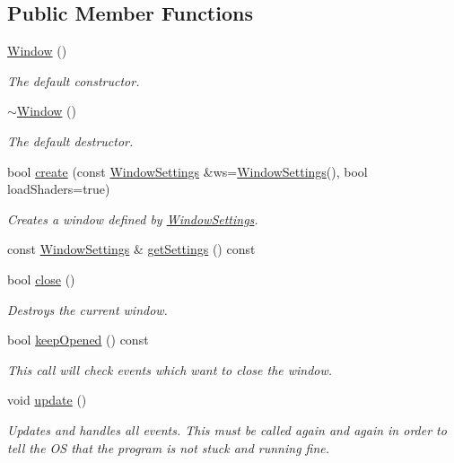 \subsection*{Public Member Functions}
\begin{DoxyCompactItemize}
\item 
\hyperlink{classburn_1_1_window_acc7f6464e1ed22854f41342becb51e62}{Window} ()
\begin{DoxyCompactList}\small\item\em The default constructor. \end{DoxyCompactList}\item 
\hyperlink{classburn_1_1_window_a47bd487f48808cab78faa5713e15f0c3}{$\sim$\-Window} ()
\begin{DoxyCompactList}\small\item\em The default destructor. \end{DoxyCompactList}\item 
bool \hyperlink{classburn_1_1_window_a6b8ac2866e1997d479becef84b3a4cf2}{create} (const \hyperlink{classburn_1_1_window_settings}{Window\-Settings} \&ws=\hyperlink{classburn_1_1_window_settings}{Window\-Settings}(), bool load\-Shaders=true)
\begin{DoxyCompactList}\small\item\em Creates a window defined by \hyperlink{classburn_1_1_window_settings}{Window\-Settings}. \end{DoxyCompactList}\item 
const \hyperlink{classburn_1_1_window_settings}{Window\-Settings} \& \hyperlink{classburn_1_1_window_a988e564ed812770ae184cf22bf05e730}{get\-Settings} () const 
\item 
bool \hyperlink{classburn_1_1_window_a1bed3eba8c1da3f0a58a3ed5de2c1071}{close} ()
\begin{DoxyCompactList}\small\item\em Destroys the current window. \end{DoxyCompactList}\item 
bool \hyperlink{classburn_1_1_window_aefd7af7009fee4982b04ac946540f7ee}{keep\-Opened} () const 
\begin{DoxyCompactList}\small\item\em This call will check events which want to close the window. \end{DoxyCompactList}\item 
void \hyperlink{classburn_1_1_window_a81e1da9f111938b38bc4c2c06dac9cfd}{update} ()
\begin{DoxyCompactList}\small\item\em Updates and handles all events. This must be called again and again in order to tell the O\-S that the program is not stuck and running fine. \end{DoxyCompactList}\item 

\end{DoxyCompactItemize}
